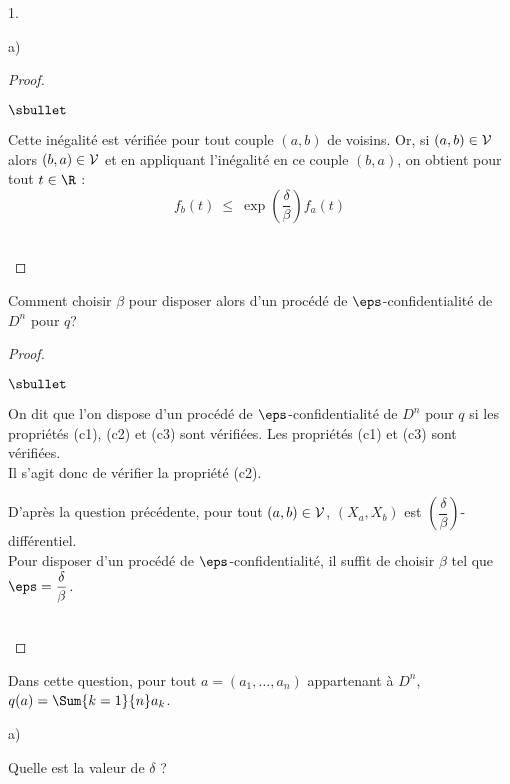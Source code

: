 \documentclass[11pt]{article}%
\begin{document}
\begin{noliste}{1.}
\begin{noliste}{a)}
\begin{proof}
\begin{noliste}{$\sbullet$}
      \item Cette inégalité est vérifiée pour tout couple $(a, b)$ de
        voisins. Or, si $(a, b) \in {\cal V}$ alors $(b, a) \in {\cal
          V}$ et en appliquant l'inégalité en ce couple $(b, a)$, on
        obtient pour tout $t \in \R$ :
        \[
        f_b(t) \ \leq \ \exp\left(\dfrac{\delta}{\beta}\right) f_a(t)
        \]
      \end{noliste}
      ~\\[-1cm]
    \end{proof}
  
  \item Comment choisir $\beta$ pour disposer alors d'un procédé de
    $\eps$-confidentialité de $D^n$ pour $q$?

    \begin{proof}~%
      \begin{noliste}{$\sbullet$}
      \item On dit que l'on dispose d'un procédé de
        $\eps$-confidentialité de $D^n$ pour $q$ si les propriétés
        (c1), (c2) et (c3) sont vérifiées. Les propriétés (c1) et (c3)
        sont vérifiées.\\
        Il s'agit donc de vérifier la propriété (c2).

      \item D'après la question précédente, pour tout $(a, b) \in
        {\cal V}$, $(X_a, X_b)$ est $\left( \dfrac{\delta}{\beta}
        \right)$-différentiel.\\
        Pour disposer d'un procédé de $\eps$-confidentialité, il
        suffit de choisir $\beta$ tel que $\eps =
        \dfrac{\delta}{\beta}$.
      \end{noliste}
      ~\\[-1cm]
    \end{proof}
  \end{noliste}

\item Dans cette question, pour tout $a = (a_1, \ldots ,a_n)$
  appartenant à $D^n$, $q(a) = \Sum{k=1}{n} a_k$.
  \begin{noliste}{a)}
    \setlength{\itemsep}{2mm} %
  \item Quelle est la valeur de $\delta$ ?


\end{noliste}
\end{noliste}
\end{document}
